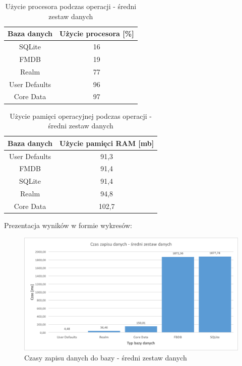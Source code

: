 \newpage

\begin{table}[h]
\centering
\caption{Użycie procesora podczas operacji - średni zestaw danych}
\label{tab: medium-save-cpu-table}
\begin{tabular}{|c|c|}
\hline
Baza danych   & Użycie procesora [\%] \\ \hline
SQLite        & 16                    \\ \hline
FMDB          & 19                    \\ \hline
Realm         & 77                    \\ \hline
User Defaults & 96                    \\ \hline
Core Data     & 97                    \\ \hline
\end{tabular}
\end{table}

\begin{table}[h]
\centering
\caption{Użycie pamięci operacyjnej podczas operacji - średni zestaw danych}
\label{tab: medium-save-ram-table}
\begin{tabular}{|c|c|}
\hline
Baza danych   & Użycie pamięci RAM [mb] \\ \hline
User Defaults & 91,3                    \\ \hline
FMDB          & 91,4                    \\ \hline
SQLite        & 91,4                    \\ \hline
Realm         & 94,8                    \\ \hline
Core Data     & 102,7                   \\ \hline
\end{tabular}
\end{table}

\newpage

Prezentacja wyników w formie wykresów: 

\begin{figure}[h]
\centering
	\includegraphics[width=15cm]{img/save_data/save_speed_medium.png}
	\caption{Czasy zapisu danych do bazy - średni zestaw danych}
	\label{fig: medium-save-time}
\end{figure}


